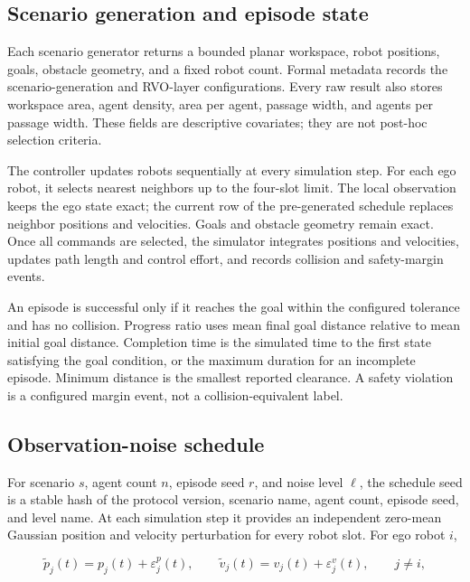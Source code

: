 \documentclass[pdflatex,sn-mathphys-num]{sn-jnl}
\begin{document}
\subsection{Scenario generation and episode state}

Each scenario generator returns a bounded planar workspace, robot positions, goals, obstacle geometry, and a fixed robot count. Formal metadata records the scenario-generation and RVO-layer configurations. Every raw result also stores workspace area, agent density, area per agent, passage width, and agents per passage width. These fields are descriptive covariates; they are not post-hoc selection criteria.

The controller updates robots sequentially at every simulation step. For each ego robot, it selects nearest neighbors up to the four-slot limit. The local observation keeps the ego state exact; the current row of the pre-generated schedule replaces neighbor positions and velocities. Goals and obstacle geometry remain exact. Once all commands are selected, the simulator integrates positions and velocities, updates path length and control effort, and records collision and safety-margin events.

An episode is successful only if it reaches the goal within the configured tolerance and has no collision. Progress ratio uses mean final goal distance relative to mean initial goal distance. Completion time is the simulated time to the first state satisfying the goal condition, or the maximum duration for an incomplete episode. Minimum distance is the smallest reported clearance. A safety violation is a configured margin event, not a collision-equivalent label.

\subsection{Observation-noise schedule}

For scenario $s$, agent count $n$, episode seed $r$, and noise level $\ell$, the schedule seed is a stable hash of the protocol version, scenario name, agent count, episode seed, and level name. At each simulation step it provides an independent zero-mean Gaussian position and velocity perturbation for every robot slot. For ego robot $i$,

\begin{equation}
\widetilde{p}_j(t)=p_j(t)+\varepsilon^p_j(t),\qquad
\widetilde{v}_j(t)=v_j(t)+\varepsilon^v_j(t),\qquad j\neq i,
\label{eq:noise}
\end{equation}
\end{document}
